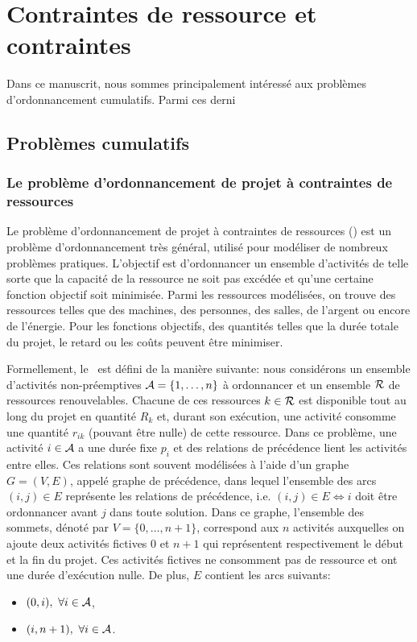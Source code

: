 
\section{Contraintes de ressource et contraintes }

Dans ce manuscrit, nous sommes principalement intéressé aux problèmes
d'ordonnancement cumulatifs. Parmi ces derni

\subsection{Problèmes cumulatifs}
\subsubsection{Le problème d'ordonnancement  de projet à contraintes de
  ressources}
\index{\RCPSPidx}
Le problème d'ordonnancement de projet à contraintes de ressources
(\RCPSP) est un problème d'ordonnancement très général, utilisé pour
modéliser de nombreux problèmes pratiques. L'objectif est
d'ordonnancer un ensemble d'activités de telle sorte que la capacité
de la ressource ne soit pas excédée et qu'une certaine fonction
objectif soit minimisée. Parmi les ressources modélisées, on trouve
des ressources telles que des machines, des personnes, des salles, de
l'argent ou encore de l'énergie. Pour les fonctions objectifs, des
quantités telles que la durée totale du projet, le retard ou les coûts
peuvent être minimiser.

Formellement, le \RCPSP~est défini de la manière suivante: nous
considérons un ensemble d'activités non-préemptives
${\cal A}=\{1,\dots,n\}$ à ordonnancer et un ensemble ${\cal R}$ de ressources
renouvelables. Chacune de ces ressources $k \in {\cal R}$ est disponible
tout au long du projet en quantité $R_k$ et, durant son exécution, une
activité consomme une quantité $r_{ik}$ (pouvant être nulle) de cette
ressource. Dans ce problème, une activité $i \in {\cal A}$ a une durée fixe
$p_i$ et des relations de précédence lient les activités entre
elles. Ces relations sont souvent modélisées à l'aide d'un graphe
$G=(V,E)$, appelé graphe de précédence, dans lequel l'ensemble des
arcs $(i,j) \in E$ représente les relations de précédence, i.e. $(i,j)
\in E \Leftrightarrow i $ doit être ordonnancer avant $j$ dans toute
solution. Dans ce graphe, l'ensemble des sommets, dénoté par
$V=\{0,\dots,n+1\}$, correspond aux $n$ activités auxquelles on ajoute
deux activités fictives $0$ et $n+1$ qui représentent respectivement
le début et la fin du projet. Ces activités fictives ne consomment pas
de ressource et ont une durée d'exécution nulle. De plus, $E$ contient
les arcs suivants: 
\begin{itemize}
\item $(0,i),\ \forall i \in {\cal A}$,
\item $(i,n+1),\ \forall i \in {\cal A}$.
\end{itemize}

